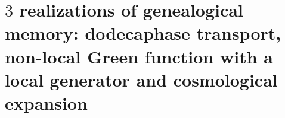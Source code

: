 \chapter{\texorpdfstring{\(3\)}{3} realizations of genealogical memory: dodecaphase transport, non-local Green function with a local generator and cosmological expansion}
\label{chap:md-memoria-tres-realizaciones}
\begingroup
\let\HMTOwnerSection\section
\let\HMTOwnerSubsection\subsection
\let\HMTOwnerSubsubsection\subsubsection
\let\HMTOwnerParagraph\paragraph
\let\chapter\HMTOwnerSection
\let\section\HMTOwnerSubsection
\let\subsection\HMTOwnerSubsubsection
\let\subsubsection\HMTOwnerParagraph

\endgroup

\begingroup
\def\HMTDesiredChapterTitle{Icosahedral descent \texorpdfstring{\(A_5/C_5\)}{A5/C5} and selection of the five-component gravitational carrier}%
\let\HMTOriginalChapter\chapter
\renewcommand{\chapter}[2][]{\HMTOriginalChapter{\HMTDesiredChapterTitle}}%

\endgroup

